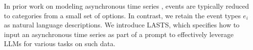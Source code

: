 



In prior work on modeling asynchronous time series \citep{duTPP, Mehrasa2019Variational, Zhang2020Self, Mei2022Transformer}, events are typically reduced to categories from a small set of options. In contrast, we retain the event types $e_i$ as natural language descriptions. We introduce LASTS, which specifies how to input an asynchronous time series as part of a prompt to effectively leverage LLMs for various tasks on such data.

